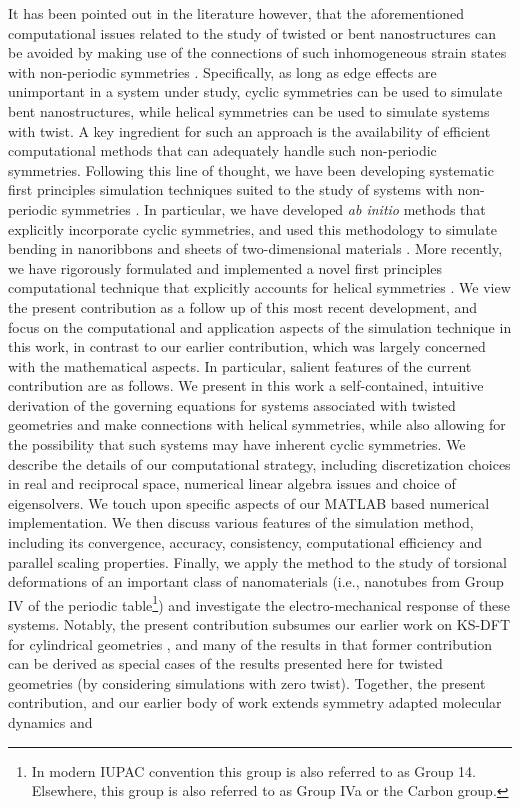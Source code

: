 \documentclass[preprint,12pt, 3p, sort&compress]{elsarticle}
\begin{document}
It has been pointed out in the literature however, that the aforementioned computational issues  related to the study of twisted or bent nanostructures can be avoided by making use of the  connections of such inhomogeneous strain states with non-periodic symmetries \citep{James_OS, Dumitrica_James_OMD, Dumitrica_Bending_Graphene, CNT_Dumitrica, ma2015thermal, Pekka_Efficient_Approach, Pekka_CNT_Bending, Pekka_GNR_Bending, Pekka_Revised_Periodic, cai2008torsion}. Specifically, as long as edge effects are unimportant in a system under study, cyclic symmetries can be used to simulate bent nanostructures, while helical symmetries can be used to simulate systems with twist. A key ingredient for such an approach is the availability of efficient computational methods that can adequately handle such non-periodic symmetries. Following this line of thought, we have been developing systematic first principles simulation techniques suited to the study of systems with non-periodic symmetries \citep{My_PhD_Thesis}. In particular, we have  developed \textit{ab initio} methods that explicitly incorporate cyclic symmetries, and used this methodology to simulate bending in nanoribbons \citep{banerjee2016cyclic} and sheets of two-dimensional materials \citep{ghosh2019symmetry}. More recently, we have rigorously formulated and implemented a novel first principles computational technique that explicitly accounts for helical symmetries \citep{banerjee2021ab}. {We view the present contribution as a follow up of this  most recent development, and focus on the computational and application aspects of the simulation technique in this work, in contrast to our earlier contribution, which was largely concerned with the mathematical aspects. In particular, salient features of the current contribution are as follows. We present in this work a self-contained, intuitive derivation of the governing equations for systems associated with twisted geometries and make connections with helical symmetries, while also allowing for the possibility that such systems may have inherent cyclic symmetries. We describe the details of our computational strategy, including discretization choices in real and reciprocal space, numerical linear algebra issues and choice of eigensolvers. We touch upon specific aspects of our MATLAB based numerical implementation. We then discuss various features of the simulation method, including its convergence, accuracy, consistency, computational efficiency and parallel scaling properties. Finally, we apply the method to the study of torsional deformations of an important class of nanomaterials (i.e., nanotubes from Group IV of the periodic table\footnote{In modern IUPAC convention this group is also referred to as Group 14. Elsewhere, this group is also referred to as Group IVa or the Carbon group.}) and investigate the electro-mechanical response of these systems.} Notably, the present contribution subsumes our earlier work on KS-DFT for cylindrical geometries \citep{ghosh2019symmetry}, and many of the results in that former contribution can be derived as special cases of the results presented here for twisted geometries (by considering simulations with zero twist). Together, the present contribution, and our earlier body of work extends symmetry adapted molecular dynamics and 
\end{document}
